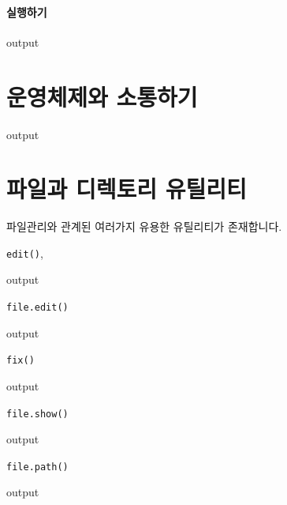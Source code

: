 \documentclass{report}
\begin{document}
\paragraph{실행하기}
\begin{Schunk}
\begin{Soutput}
output
\end{Soutput}
\end{Schunk}

\section{운영체제와 소통하기}
\begin{Schunk}
\begin{Soutput}
output
\end{Soutput}
\end{Schunk}

\section{파일과 디렉토리 유틸리티}
파일관리와 관계된 여러가지 유용한 유틸리티가 존재합니다. 

\texttt{edit()},
\begin{Schunk}
\begin{Soutput}
output
\end{Soutput}
\end{Schunk}

\texttt{file.edit()}
\begin{Schunk}
\begin{Soutput}
output
\end{Soutput}
\end{Schunk}

\texttt{fix()}
\begin{Schunk}
\begin{Soutput}
output
\end{Soutput}
\end{Schunk}

\texttt{file.show()}
\begin{Schunk}
\begin{Soutput}
output
\end{Soutput}
\end{Schunk}

\texttt{file.path()}
\begin{Schunk}
\begin{Soutput}
output
\end{Soutput}
\end{Schunk}
\end{document}

